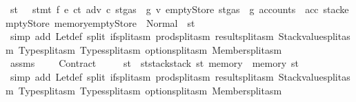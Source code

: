 \begin{isabellebody}
\ st{\isacharprime}{\kern0pt}{\isacharprime}{\kern0pt}\ \ {}{\isacharcolon}{\kern0pt}\ {\isachardoublequoteopen}stmt\ f\ {\isacharparenleft}{\kern0pt}e{\isacharprime}{\kern0pt}\ ct\ adv\ c\ {\isacharparenleft}{\kern0pt}st{\isasymlparr}gas\ {\isacharcolon}{\kern0pt}{\isacharequal}{\kern0pt}\ g{\isacharprime}{\kern0pt}{\isasymrparr}{\isacharparenright}{\kern0pt}\ v{\isacharprime}{\kern0pt}{\isacharparenright}{\kern0pt}\ emptyStore\ {\isacharparenleft}{\kern0pt}st{\isasymlparr}gas\ {\isacharcolon}{\kern0pt}{\isacharequal}{\kern0pt}\ g{\isacharprime}{\kern0pt}{\isacharcomma}{\kern0pt}\ accounts\ {\isacharcolon}{\kern0pt}{\isacharequal}{\kern0pt}\ acc{\isacharcomma}{\kern0pt}\ stack{\isacharcolon}{\kern0pt}{\isacharequal}{\kern0pt}emptyStore{\isacharcomma}{\kern0pt}\ memory{\isacharcolon}{\kern0pt}{\isacharequal}{\kern0pt}emptyStore{\isasymrparr}{\isacharparenright}{\kern0pt}\ {\isacharequal}{\kern0pt}\ Normal\ {\isacharparenleft}{\kern0pt}{\isacharparenleft}{\kern0pt}{\isacharparenright}{\kern0pt}{\isacharcomma}{\kern0pt}\ st{\isacharprime}{\kern0pt}{\isacharprime}{\kern0pt}{\isacharparenright}{\kern0pt}{\isachardoublequoteclose}\ \isamarkupfalse%
\ {\isacharparenleft}{\kern0pt}simp\ add{\isacharcolon}{\kern0pt}\ Let{\isacharunderscore}{\kern0pt}def\ split{\isacharcolon}{\kern0pt}\ if{\isacharunderscore}{\kern0pt}split{\isacharunderscore}{\kern0pt}asm\ prod{\isachardot}{\kern0pt}split{\isacharunderscore}{\kern0pt}asm\ result{\isachardot}{\kern0pt}split{\isacharunderscore}{\kern0pt}asm\ Stackvalue{\isachardot}{\kern0pt}split{\isacharunderscore}{\kern0pt}asm\ Type{\isachardot}{\kern0pt}split{\isacharunderscore}{\kern0pt}asm\ Types{\isachardot}{\kern0pt}split{\isacharunderscore}{\kern0pt}asm\ option{\isachardot}{\kern0pt}split{\isacharunderscore}{\kern0pt}asm\ Member{\isachardot}{\kern0pt}split{\isacharunderscore}{\kern0pt}asm{\isacharparenright}{\kern0pt}\isanewline
\ \ \ \ \isamarkupfalse%
\ \isamarkupfalse%
\ assms\ {}\ {}\ {}\ {}\ Contract\ {}\ {}\ {}\ \isamarkupfalse%
\ {\isachardoublequoteopen}st{\isacharprime}{\kern0pt}\ {\isacharequal}{\kern0pt}\ st{\isacharprime}{\kern0pt}{\isacharprime}{\kern0pt}{\isasymlparr}stack{\isacharcolon}{\kern0pt}{\isacharequal}{\kern0pt}stack\ st{\isacharcomma}{\kern0pt}\ memory\ {\isacharcolon}{\kern0pt}{\isacharequal}{\kern0pt}\ memory\ st{\isasymrparr}{\isachardoublequoteclose}\ \isamarkupfalse%
\ {\isacharparenleft}{\kern0pt}simp\ add{\isacharcolon}{\kern0pt}\ Let{\isacharunderscore}{\kern0pt}def\ split{\isacharcolon}{\kern0pt}\ if{\isacharunderscore}{\kern0pt}split{\isacharunderscore}{\kern0pt}asm\ prod{\isachardot}{\kern0pt}split{\isacharunderscore}{\kern0pt}asm\ result{\isachardot}{\kern0pt}split{\isacharunderscore}{\kern0pt}asm\ Stackvalue{\isachardot}{\kern0pt}split{\isacharunderscore}{\kern0pt}asm\ Type{\isachardot}{\kern0pt}split{\isacharunderscore}{\kern0pt}asm\ Types{\isachardot}{\kern0pt}split{\isacharunderscore}{\kern0pt}asm\ option{\isachardot}{\kern0pt}split{\isacharunderscore}{\kern0pt}asm\ Member{\isachardot}{\kern0pt}split{\isacharunderscore}{\kern0pt}asm{\isacharparenright}{\kern0pt}\isanewline

\end{isabellebody}
